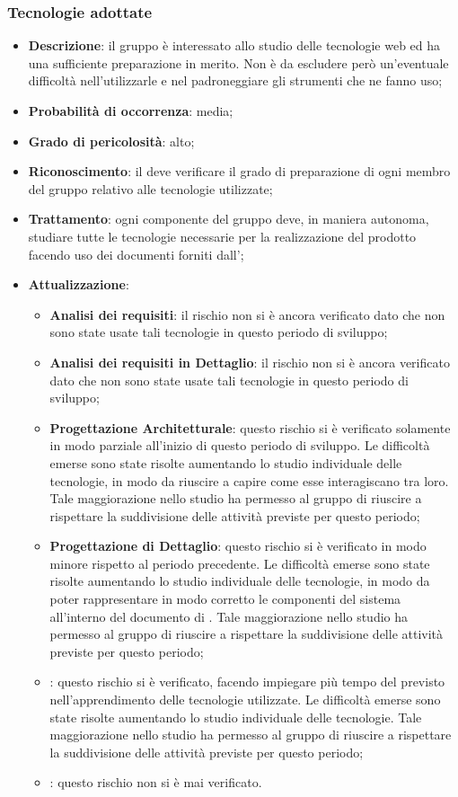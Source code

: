 		\subsubsection{Tecnologie adottate}
		\begin{itemize}
			\item \textbf{Descrizione}: il gruppo è interessato allo studio delle tecnologie web ed ha una sufficiente preparazione in merito. Non è da escludere però un'eventuale difficoltà nell'utilizzarle e nel padroneggiare gli strumenti che ne fanno uso;
			\item \textbf{Probabilità di occorrenza}: media;
			\item \textbf{Grado di pericolosità}: alto;
			\item \textbf{Riconoscimento}: il \textit{\Res} deve verificare il grado di preparazione di ogni membro del gruppo relativo alle tecnologie utilizzate;	
			\item \textbf{Trattamento}: ogni componente del gruppo deve, in maniera autonoma, studiare tutte le tecnologie necessarie per la realizzazione del prodotto facendo uso dei documenti forniti dall'\textit{\Amm};
			\item \textbf{Attualizzazione}:
				\begin{itemize}
					\item \textbf{Analisi dei requisiti}: il rischio non si è ancora verificato dato che non sono state usate tali tecnologie in questo periodo di sviluppo;
					\item \textbf{Analisi dei requisiti in Dettaglio}: il rischio non si è ancora verificato dato che non sono state usate tali tecnologie in questo periodo di sviluppo;
					\item \textbf{Progettazione Architetturale}: questo rischio si è verificato solamente in modo parziale all'inizio di questo periodo di sviluppo. Le difficoltà emerse sono state risolte aumentando lo studio individuale delle tecnologie, in modo da riuscire a capire come esse interagiscano tra loro. Tale maggiorazione nello studio ha permesso al gruppo di riuscire a rispettare la suddivisione delle attività previste per questo periodo; 
					\item \textbf{Progettazione di Dettaglio}: questo rischio si è verificato in modo minore rispetto al periodo precedente. Le difficoltà emerse sono state risolte aumentando lo studio individuale delle tecnologie, in modo da poter rappresentare in modo corretto le componenti del sistema all'interno del documento di \textit{\DdPv}. Tale maggiorazione nello studio ha permesso al gruppo di riuscire a rispettare la suddivisione delle attività previste per questo periodo;
					\item \textbf{\CO}: questo rischio si è verificato, facendo impiegare più tempo del previsto nell'apprendimento delle tecnologie utilizzate. Le difficoltà emerse sono state risolte aumentando lo studio individuale delle tecnologie. Tale maggiorazione nello studio ha permesso al gruppo di riuscire a rispettare la suddivisione delle attività previste per questo periodo;
					\item \textbf{\VV}: questo rischio non si è mai verificato.
				\end{itemize}
		\end{itemize}
		
